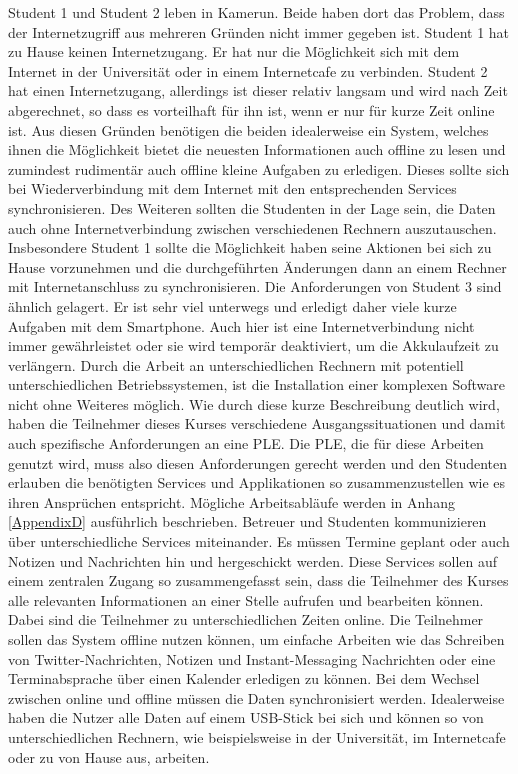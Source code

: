 Student 1 und Student 2 leben in Kamerun. Beide haben dort das Problem, dass der Internetzugriff aus mehreren Gründen nicht immer gegeben ist. Student 1 hat zu Hause keinen Internetzugang. Er hat nur die Möglichkeit sich mit dem Internet in der Universität oder in einem Internetcafe zu verbinden. Student 2 hat einen Internetzugang, allerdings ist dieser relativ langsam und wird nach Zeit abgerechnet, so dass es vorteilhaft für ihn ist, wenn er nur für kurze Zeit online ist. Aus diesen Gründen benötigen die beiden idealerweise ein System, welches ihnen die Möglichkeit bietet die neuesten Informationen auch offline zu lesen und zumindest rudimentär auch offline kleine Aufgaben zu erledigen. Dieses sollte sich bei Wiederverbindung mit dem Internet mit den entsprechenden Services synchronisieren. Des Weiteren sollten die Studenten in der Lage sein, die Daten auch ohne Internetverbindung zwischen verschiedenen Rechnern auszutauschen. Insbesondere Student 1 sollte die Möglichkeit haben seine Aktionen bei sich zu Hause vorzunehmen und die durchgeführten Änderungen dann an einem Rechner mit Internetanschluss zu synchronisieren. Die Anforderungen von Student 3 sind ähnlich gelagert. Er ist sehr viel unterwegs und erledigt daher viele kurze Aufgaben mit dem Smartphone. Auch hier ist eine Internetverbindung nicht immer gewährleistet oder sie wird temporär deaktiviert, um die Akkulaufzeit zu verlängern. Durch die Arbeit an unterschiedlichen Rechnern mit potentiell unterschiedlichen Betriebssystemen, ist die Installation einer komplexen Software nicht ohne Weiteres möglich. Wie durch diese kurze Beschreibung deutlich wird, haben die Teilnehmer dieses Kurses verschiedene Ausgangssituationen und damit auch spezifische Anforderungen an eine \ac{PLE}. Die \ac{PLE}, die für diese Arbeiten genutzt wird, muss also diesen Anforderungen gerecht werden und den Studenten erlauben die benötigten Services und Applikationen so zusammenzustellen wie es ihren Ansprüchen entspricht. Mögliche Arbeitsabläufe werden in Anhang \ref{AppendixD} ausführlich beschrieben. Betreuer und Studenten kommunizieren über unterschiedliche Services miteinander. Es müssen Termine geplant oder auch Notizen und Nachrichten hin und hergeschickt werden. Diese Services sollen auf einem zentralen Zugang so zusammengefasst sein, dass die Teilnehmer des Kurses alle relevanten Informationen an einer Stelle aufrufen und bearbeiten können. Dabei sind die Teilnehmer zu unterschiedlichen Zeiten online. Die Teilnehmer sollen das System offline nutzen können, um einfache Arbeiten wie das Schreiben von Twitter-Nachrichten, Notizen und Instant-Messaging Nachrichten oder eine Terminabsprache über einen Kalender erledigen zu können. Bei dem Wechsel zwischen online und offline müssen die Daten synchronisiert werden. Idealerweise haben die Nutzer alle Daten auf einem USB-Stick bei sich und können so von unterschiedlichen Rechnern, wie beispielsweise in der Universität, im Internetcafe oder zu von Hause aus, arbeiten.

